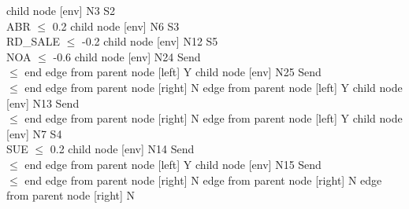       child { node [env] {N3  S2 \\ ABR $\leq$ 0.2} 
            child { node [env] {N6  S3 \\ RD_SALE $\leq$ -0.2} 
                  child { node [env] {N12  S5 \\ NOA $\leq$ -0.6} 
                        child { node [env] {N24  Send \\  $\leq$ end} 
                              edge from parent node [left] {Y} 
                        }
                        child { node [env] {N25  Send \\  $\leq$ end} 
                              edge from parent node [right] {N} 
                        }
                        edge from parent node [left] {Y} 
                  }
                  child { node [env] {N13  Send \\  $\leq$ end} 
                        edge from parent node [right] {N} 
                  }
                  edge from parent node [left] {Y} 
            }
            child { node [env] {N7  S4 \\ SUE $\leq$ 0.2} 
                  child { node [env] {N14  Send \\  $\leq$ end} 
                        edge from parent node [left] {Y} 
                  }
                  child { node [env] {N15  Send \\  $\leq$ end} 
                        edge from parent node [right] {N} 
                  }
                  edge from parent node [right] {N} 
            }
            edge from parent node [right] {N} 
      }

